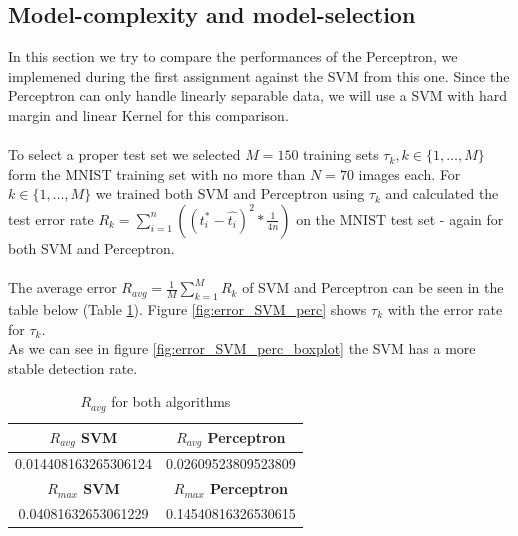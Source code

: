 \subsection{Model-complexity and model-selection}


In this section we try to compare the performances of the Perceptron, we implemened during the first assignment against the SVM from this one.
Since the Perceptron can only handle linearly separable data, we will use a SVM with hard margin and linear Kernel for this comparison.
\\
\\
To select a proper test set we selected $M = 150$ training sets $\tau _{k},k \in \{1,\ldots,M\}$ form the MNIST training set with no more than $N = 70$ images each.
For $k \in \{1,\ldots,M\}$ we trained both SVM and Perceptron using $\tau_k$ and calculated the test error rate $R_k = \sum_{i=1}^{n}( (t_{i}^{\ast} - \hat{t_{i}} )^2 * \frac{1}{4n} ) $ on the {MNIST} test set - again for both SVM and Perceptron.
\\
\\
The average error $R_{avg} = \frac{1}{M}\sum_{k=1}^M R_k$ of SVM and Perceptron can be seen in the table below (Table \ref{tab:avg_error}).
Figure \ref{fig:error_SVM_perc} shows $\tau_k$ with the error rate for $\tau_k$.\\
As we can see in figure \ref{fig:error_SVM_perc_boxplot} the SVM has a more stable detection rate.


\begin{table}[!h]
 \begin{center}
\begin{tabular}{|c|c|}
 \hline
 \textbf{$R_{avg}$ SVM} & \textbf{ $R_{avg}$ Perceptron} \\
 \hline
 0.014408163265306124       &     0.02609523809523809      \\
 \hline
  \hline
 \textbf{$R_{max}$ SVM} & \textbf{ $R_{max}$ Perceptron} \\
 \hline
0.04081632653061229       &     0.14540816326530615      \\
 \hline
\end{tabular}
\caption{\label{tab:avg_error} $R_{avg}$ for both algorithms }
\end{center}
\end{table}

